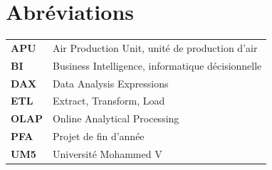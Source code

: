 \documentclass[12pt,oneside]{book}
\begin{document}
\chapter*{Abréviations}
\begin{tabularx}{\textwidth}{>{\bfseries}lX}
APU & Air Production Unit, unité de production d'air\\
BI & Business Intelligence, informatique décisionnelle\\
DAX & Data Analysis Expressions\\
ETL & Extract, Transform, Load\\
OLAP & Online Analytical Processing\\
PFA & Projet de fin d'année\\
UM5 & Université Mohammed V\\
\end{tabularx}
\tableofcontents
\listoffigures
\listoftables
\mainmatter









\appendix

\backmatter
\printbibliography[heading=bibintoc,title={Bibliographie et webographie}]
\end{document}
